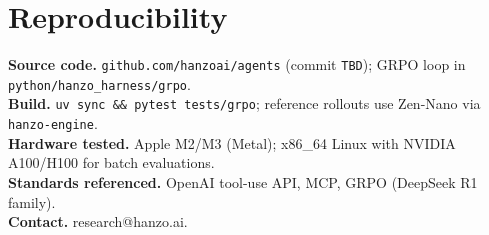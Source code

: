 \documentclass[11pt]{article}
\begin{document}












\section*{Reproducibility}
\textbf{Source code.} \texttt{github.com/hanzoai/agents} (commit \texttt{TBD}); GRPO loop in \texttt{python/hanzo\_harness/grpo}.\\
\textbf{Build.} \texttt{uv sync \&\& pytest tests/grpo}; reference rollouts use Zen-Nano via \texttt{hanzo-engine}.\\
\textbf{Hardware tested.} Apple M2/M3 (Metal); x86\_64 Linux with NVIDIA A100/H100 for batch evaluations.\\
\textbf{Standards referenced.} OpenAI tool-use API, MCP, GRPO (DeepSeek R1 family).\\
\textbf{Contact.} research@hanzo.ai.
\end{document}
